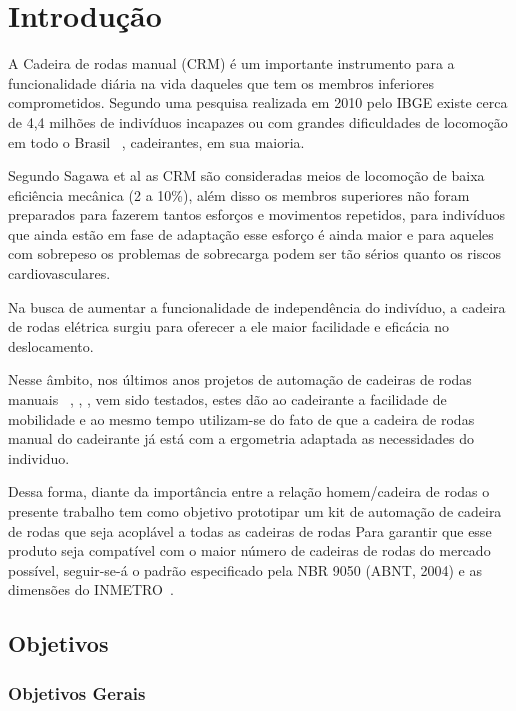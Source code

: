 \chapter[Introdução]{Introdução}

A Cadeira de rodas manual (CRM) é um importante instrumento para a funcionalidade diária na vida daqueles que tem os membros inferiores comprometidos. Segundo uma pesquisa realizada em 2010 pelo IBGE existe cerca de 4,4 milhões de indivíduos incapazes ou com grandes dificuldades de locomoção em todo o Brasil ~\cite{ibge:cartilha:2010}, cadeirantes, em sua maioria.

Segundo Sagawa et al  as CRM são consideradas meios de locomoção de baixa eficiência mecânica (2 a 10\%), além disso os membros superiores não foram preparados para fazerem tantos esforços e movimentos repetidos,  para indivíduos que ainda estão em fase de adaptação esse esforço é ainda maior e para aqueles com sobrepeso os problemas de sobrecarga podem ser tão sérios quanto os riscos cardiovasculares.

Na busca de aumentar a funcionalidade de independência do indivíduo, a cadeira de rodas elétrica surgiu para oferecer a ele maior facilidade e eficácia no deslocamento.

Nesse âmbito, nos últimos anos projetos de automação de cadeiras de rodas manuais ~\cite{brunel:wheelchair:2004}, \cite{artigo_rudi}, \cite{patent_cadeira_rodas_eletrica},	 \cite{marcos:controle:2002}  vem sido testados, estes dão ao cadeirante a facilidade de mobilidade  e ao mesmo tempo utilizam-se do fato de que a cadeira de rodas manual do cadeirante já está com a ergometria  adaptada as necessidades do individuo.

Dessa forma, diante da importância entre a relação homem/cadeira de rodas o presente trabalho tem como objetivo prototipar um kit de automação de cadeira de rodas que seja acoplável a todas as cadeiras de rodas  Para garantir que esse produto seja compatível com o maior número de cadeiras de rodas do mercado possível, seguir-se-á o padrão especificado pela NBR 9050 (ABNT, 2004) e as dimensões do INMETRO~\cite{inmetro}.

\section{Objetivos}
\subsection{Objetivos Gerais}

